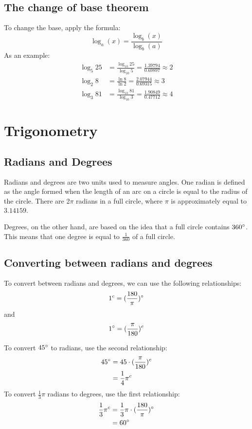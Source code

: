 \documentclass{book}
\newcommand{\rad}{^{c}}
\begin{document}
\section{The change of base theorem}
To change the base, apply the formula:
\[
	\log_{a}{(x)} = \frac{\log_{b}{(x)}}{\log_{b}{(a)}}
\]
As an example:
\begin{align*}
	\log_{5}25 & = \frac{\log_{10}25}{\log_{10}5} = \frac{1.39794}{0.69897} \approx 2 \\
	\log_{2}8  & = \frac{\ln 8}{\ln 2} = \frac{2.07944}{0.69315} \approx 3            \\
	\log_{3}81 & = \frac{\log_{10}81}{\log_{10}3} = \frac{1.90849}{0.47712} \approx 4
\end{align*}

\chapter{Trigonometry}

\section{Radians and Degrees}
Radians and degrees are two units used to measure angles.  One radian is defined as the angle formed when the length of an arc on a circle is equal to the radius of the circle. There are 2$\pi$ radians in a full circle, where $\pi$ is approximately equal to $3.14159$.

Degrees, on the other hand, are based on the idea that a full circle contains $360\degree$. This means that one degree is equal to $\frac{1}{360}$ of a full circle.

\section{Converting between radians and degrees}
To convert between radians and degrees, we can use the following relationships:
\[
	1\rad = ({\frac{180}{\pi}})\degree
\]
and
\[
	1\degree = (\frac{\pi}{180})\rad
\]

To convert $45\degree$ to radians, use the second relationship:
\begin{align*}
	45\degree & = 45 \cdot (\frac{\pi}{180})\rad \\
	          & = \frac{1}{4}\pi\rad
\end{align*}
To convert $\frac{1}{3}\pi$ radians to degrees, use the first relationship:
\begin{align*}
	\frac{1}{3}\pi\rad & = \frac{1}{3}\pi \cdot (\frac{180}{\pi})\degree \\
	                   & = 60\degree
\end{align*}
\end{document}
